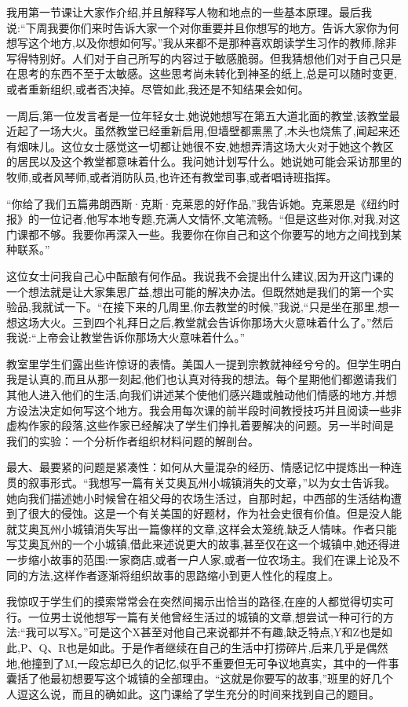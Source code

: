 我用第一节课让大家作介绍,并且解释写人物和地点的一些基本原理。最后我说:“下周我要你们来时告诉大家一个对你重要并且你想写的地方。告诉大家你为何想写这个地方,以及你想如何写。”我从来都不是那种喜欢朗读学生习作的教师,除非写得特别好。人们对于自己所写的内容过于敏感脆弱。但我猜想他们对于自己只是在思考的东西不至于太敏感。这些思考尚未转化到神圣的纸上,总是可以随时变更,或者重新组织,或者否决掉。尽管如此,我还是不知结果会如何。

一周后,第一位发言者是一位年轻女士,她说她想写在第五大道北面的教堂,该教堂最近起了一场大火。虽然教堂已经重新启用,但墙壁都熏黑了,木头也烧焦了,闻起来还有烟味儿。这位女士感觉这一切都让她很不安,她想弄清这场大火对于她这个教区的居民以及这个教堂都意味着什么。我问她计划写什么。她说她可能会采访那里的牧师,或者风琴师,或者消防队员,也许还有教堂司事,或者唱诗班指挥。

“你给了我们五篇弗朗西斯·克斯·克莱恩的好作品,”我告诉她。克莱恩是《纽约时报》的一位记者,他写本地专题,充满人文情怀,文笔流畅。“但是这些对你,对我,对这门课都不够。我要你再深入一些。我要你在你自己和这个你要写的地方之间找到某种联系。”

这位女士问我自己心中酝酿有何作品。我说我不会提出什么建议,因为开这门课的一个想法就是让大家集思广益,想出可能的解决办法。但既然她是我们的第一个实验品,我就试一下。“在接下来的几周里,你去教堂的时候,”我说,“只是坐在那里,想一想这场大火。三到四个礼拜日之后,教堂就会告诉你那场大火意味着什么了。”然后我说:“上帝会让教堂告诉你那场大火意味着什么。”

教室里学生们露出些许惊讶的表情。美国人一提到宗教就神经兮兮的。但学生明白我是认真的,而且从那一刻起,他们也认真对待我的想法。每个星期他们都邀请我们其他人进入他们的生活,向我们讲述某个使他们感兴趣或触动他们情感的地方,并想方设法决定如何写这个地方。我会用每次课的前半段时间教授技巧并且阅读一些非虚构作家的段落,这些作家已经解决了学生们挣扎着要解决的问题。另一半时间是我们的实验：一个分析作者组织材料问题的解剖台。

最大、最要紧的问题是紧凑性：如何从大量混杂的经历、情感记忆中提炼出一种连贯的叙事形式。“我想写一篇有关艾奥瓦州小城镇消失的文章，”以为女士告诉我。她向我们描述她小时候曾在祖父母的农场生活过，自那时起，中西部的生活结构遭到了很大的侵蚀。这是一个有关美国的好题材，作为社会史很有价值。但是没人能就艾奥瓦州小城镇消失写出一篇像样的文章,这样会太笼统,缺乏人情味。作者只能写艾奥瓦州的一个小城镇,借此来述说更大的故事,甚至仅在这一个城镇中,她还得进一步缩小故事的范围:一家商店,或者一户人家,或者一位农场主。我们在课上论及不同的方法,这样作者逐渐将组织故事的思路缩小到更人性化的程度上。

我惊叹于学生们的摸索常常会在突然间揭示出恰当的路径,在座的人都觉得切实可行。一位男士说他想写一篇有关他曾经生活过的城镇的文章,想尝试一种可行的方法:“我可以写X。”可是这个X甚至对他自己来说都并不有趣,缺乏特点,Y和Z也是如此,P、Q、R也是如此。于是作者继续在自己的生活中打捞碎片,后来几乎是偶然地,他撞到了M,一段忘却已久的记忆,似乎不重要但无可争议地真实，其中的一件事囊括了他最初想要写这个城镇的全部理由。“这就是你要写的故事,”班里的好几个人逗这么说，而且的确如此。这门课给了学生充分的时间来找到自己的题目。

